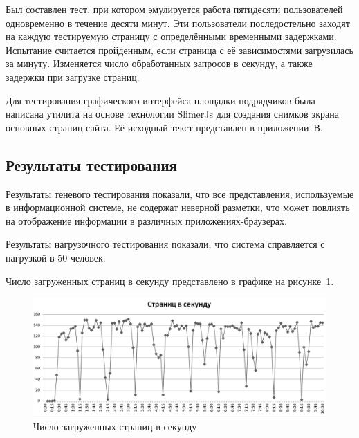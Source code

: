 Был составлен тест, при котором эмулируется работа пятидесяти пользователей одновременно в течение десяти минут.
Эти пользователи последостельно заходят на каждую тестируемую страницу с определёнными временными задержками.
Испытание считается пройденным, если страница с её зависимостями загрузилась за минуту.
Изменяется число обработанных запросов в секунду, а также задержки при загрузке страниц.

Для тестирования графического интерфейса площадки подрядчиков была написана утилита на основе технологии SlimerJs для создания снимков экрана основных страниц сайта.
Её исходный текст представлен в приложении~В.

\subsection{Результаты тестирования}

Результаты теневого тестирования показали, что все представления, используемые в информационной системе, не содержат неверной разметки, что может повлиять на отображение информации в различных приложениях-браузерах.

Результаты нагрузочного тестирования показали, что система справляется с нагрузкой в 50 человек.

Число загруженных страниц в секунду представлено в графике на рисунке~\ref{img:test-pagespersec}.

\begin{figure}[h!]
	\begin{center}
		\begin{minipage}[h]{\linewidth}
			\includegraphics[width=\linewidth]{images/test-pagespersec.png}
			\caption{Число загруженных страниц в секунду}
			\label{img:test-pagespersec}
		\end{minipage}
		\hfill
	\end{center}
\end{figure}

